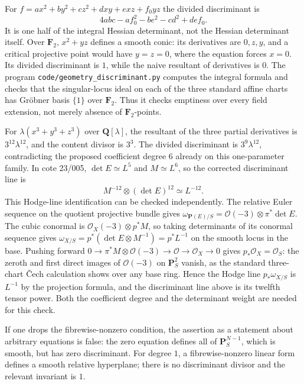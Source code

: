 \begin{example}
\label{geo-E-conic}
For $f=ax^2+by^2+cz^2+dxy+exz+f_0yz$ the divided discriminant is
\[
 4abc-af_0^2-be^2-cd^2+def_0.
\]
It is one half of the integral Hessian determinant, not the Hessian
determinant itself. Over $\mathbf F_2$, $x^2+yz$ defines a smooth conic:
its derivatives are $0,z,y$, and a critical projective point would have
$y=z=0$, where the equation forces $x=0$. Its divided discriminant is $1$,
while the naive resultant of derivatives is $0$. The program
\texttt{code/geometry\_discriminant.py} computes the integral formula and
checks that the singular-locus ideal on each of the three standard affine
charts has Gr\"obner basis $\{1\}$ over $\mathbf F_2$. Thus it checks emptiness
over every field extension, not merely absence of $\mathbf F_2$-points.
\end{example}

\begin{example}
\label{geo-E-cubic}
For $\lambda(x^3+y^3+z^3)$ over $\mathbf Q[\lambda]$, the resultant of the
three partial derivatives is $3^{12}\lambda^{12}$, and the content divisor
is $3^3$. The divided discriminant is $3^9\lambda^{12}$, contradicting
the proposed coefficient degree $6$ already on this one-parameter family.
In cote 23/005, $\det E\simeq L^5$ and $M\simeq L^6$, so the corrected
discriminant line is
\[
 M^{-12}\otimes(\det E)^{12}\simeq L^{-12}.
\]
This Hodge-line identification can be checked independently. The relative
Euler sequence on the quotient projective bundle gives
$\omega_{\mathbf P(E)/S}=\mathcal O(-3)\otimes\pi^*\det E$.
The cubic conormal is $\mathcal O_X(-3)\otimes p^*M$, so taking
determinants of its conormal sequence gives
$\omega_{X/S}=p^*(\det E\otimes M^{-1})=p^*L^{-1}$ on the smooth
locus in the base. Pushing forward
$0\to\pi^*M\otimes\mathcal O(-3)\to\mathcal O\to\mathcal O_X\to0$
gives $p_*\mathcal O_X=\mathcal O_S$: the zeroth and first direct images
of $\mathcal O(-3)$ on $\mathbf P^2_S$ vanish, as the standard three-chart
\v Cech calculation shows over any base ring. Hence the Hodge line
$p_*\omega_{X/S}$ is $L^{-1}$ by the projection formula, and the
discriminant line above is its twelfth tensor power. Both the coefficient
degree and the determinant weight are needed for this check.
\end{example}

If one drops the fibrewise-nonzero condition, the assertion as a statement
about arbitrary equations is false: the zero equation defines all of
$\mathbf P^{N-1}_S$, which is smooth, but has zero discriminant. For degree
$1$, a fibrewise-nonzero linear form defines a smooth relative hyperplane;
there is no discriminant divisor and the relevant invariant is $1$.
